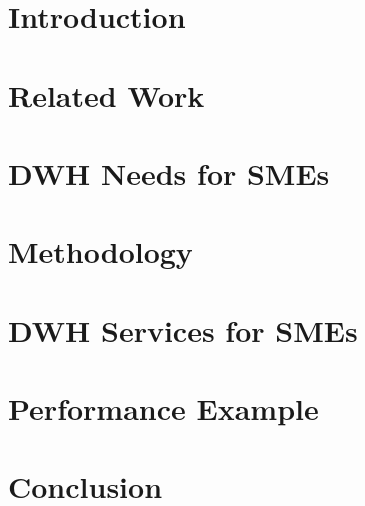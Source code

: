 \documentclass{article}
\begin{document}
\maketitle

\newpage



\newpage

\tableofcontents

\newpage


\section{Introduction}
\label{sec:introduction}


\newpage

\section{Related Work}
\label{sec:related-work}


\newpage

\section{DWH Needs for SMEs}
\label{sec:dwh-needs-for-smes}


\newpage

\section{Methodology}
\label{sec:methodology}


\newpage

\section{DWH Services for SMEs}
\label{sec:dwh-services-for-smes}


\newpage

\section{Performance Example}
\label{sec:performance-example}


\newpage

\section{Conclusion}
\label{sec:conclusion}

\newpage
\printbibliography
\end{document}
